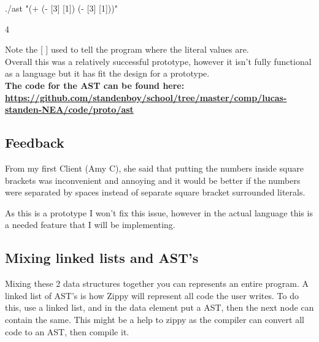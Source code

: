 \documentclass[a4paper,12pt]{article}
\begin{document}
{ ./ast "(+ (- [3] [1]) (- [3] [1]))"

4

{\small Note the [ ] used to tell the program where the literal values are.}
\\

Overall this was a relatively successful prototype, however it isn't fully functional 
as a language but it has fit the design for a prototype.
\\

\textbf{The code for the AST can be found here:
\url{https://github.com/standenboy/school/tree/master/comp/lucas-standen-NEA/code/proto/ast}}

\subsection{Feedback}
From my first Client (Amy C), she said that putting the numbers inside square brackets 
was inconvenient and annoying and it would be better if the numbers were separated
by spaces instead of separate square bracket surrounded literals.

As this is a prototype I won't fix this issue, however in the actual language this is 
a needed feature that I will be implementing.

\subsection{Mixing linked lists and AST's}
Mixing these 2 data structures together you can represents an entire program. A linked 
list of AST's is how Zippy will represent all code the user writes. To do this, use a 
linked list, and in the data element put a AST, then the next node can contain the same. 
This might be a help to zippy as the compiler can convert all code to an AST, then 
compile it.
}
\end{document}
